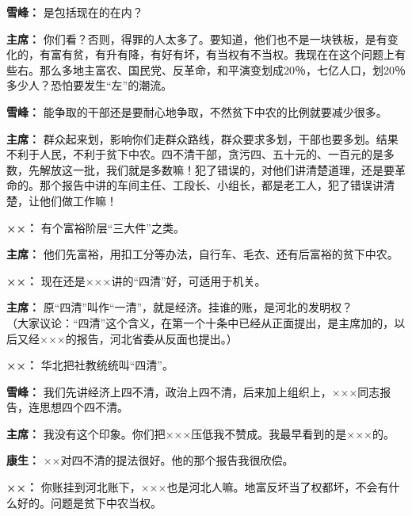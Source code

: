 \begin{duihua}
\item[\textbf{雪峰：}] 是包括现在的在内？

\item[\textbf{主席：}] 你们看？否则，得罪的人太多了。要知道，他们也不是一块铁板，是有变化的，有富有贫，有升有降，有好有坏，有当权有不当权。我现在在这个问题上有些右。那么多地主富农、国民党、反革命，和平演变划成20％，七亿人口，划20％多少人？恐怕要发生“左”的潮流。

\item[\textbf{雪峰：}] 能争取的干部还是要耐心地争取，不然贫下中农的比例就要减少很多。

\item[\textbf{主席：}] 群众起来划，影响你们走群众路线，群众要求多划，干部也要多划。结果不利于人民，不利于贫下中农。四不清干部，贪污四、五十元的、一百元的是多数，先解放这一批，我们就是多数嘛！犯了错误的，对他们讲清楚道理，还是要革命的。那个报告中讲的车间主任、工段长、小组长，都是老工人，犯了错误讲清楚，让他们做工作嘛！

\item[\textbf{××：}] 有个富裕阶层“三大件”之类。

\item[\textbf{主席：}] 他们先富裕，用扣工分等办法，自行车、毛衣、还有后富裕的贫下中农。

\item[\textbf{××：}] 现在还是×××讲的“四清”好，可适用于机关。

\item[\textbf{主席：}] 原“四清”叫作“一清”，就是经济。挂谁的账，是河北的发明权？\\
（大家议论：“四清”这个含义，在第一个十条中已经从正面提出，是主席加的，以后又经×××的报告，河北省委从反面也提出。）

\item[\textbf{××：}] 华北把社教统统叫“四清”。

\item[\textbf{雪峰：}] 我们先讲经济上四不清，政治上四不清，后来加上组织上，×××同志报告，连思想四个四不清。

\item[\textbf{主席：}] 我没有这个印象。你们把×××压低我不赞成。我最早看到的是×××的。

\item[\textbf{康生：}] ××对四不清的提法很好。他的那个报告我很欣偿。

\item[\textbf{××：}] 你账挂到河北账下，×××也是河北人嘛。地富反坏当了权都坏，不会有什么好的。问题是贫下中农当权。


\end{duihua}
